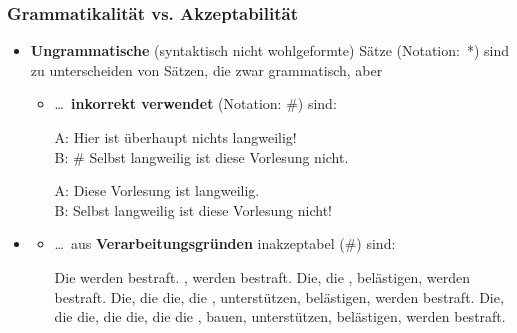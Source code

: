 \begin{frame}
\frametitle{Grammatikalität vs. Akzeptabilität}

\begin{itemize}
	\item \textbf{Ungrammatische} (syntaktisch nicht wohlgeformte) Sätze (Notation:~*) sind zu unterscheiden von Sätzen, die zwar grammatisch, aber
	
	\begin{itemize}
		\item \dots\ \textbf{inkorrekt verwendet} (Notation: \#) sind:
		
		\settowidth{}
		
		\ea A: Hier ist überhaupt nichts langweilig!\\
		B: \# Selbst langweilig ist diese Vorlesung nicht.
		\z
\pause

		\ea A: Diese Vorlesung ist langweilig.\\
		B: Selbst langweilig ist diese Vorlesung nicht!
		\z
		
	\end{itemize}

\end{itemize}

\nocite{Coseriu88a, Fries15a, Repp&Co15a}

\end{frame}


\begin{frame}

\begin{itemize}
	\item[]
	
	\begin{itemize}
	\item \dots\ aus \textbf{Verarbeitungsgründen} inakzeptabel (\#) sind:

		\settowidth{}
				
\pause
		\ex Die werden bestraft.
		\ex {}, werden bestraft.
		\ex Die, die , belästigen, werden bestraft.
		\ex Die, die die, die , unterstützen, belästigen, werden bestraft.
		\ex Die, die die, die die, die die , bauen, unterstützen, belästigen, werden bestraft.
		\z
\end{itemize}

\end{itemize}
\nocite{Fries15a, Repp&Co15a}
\end{frame}


